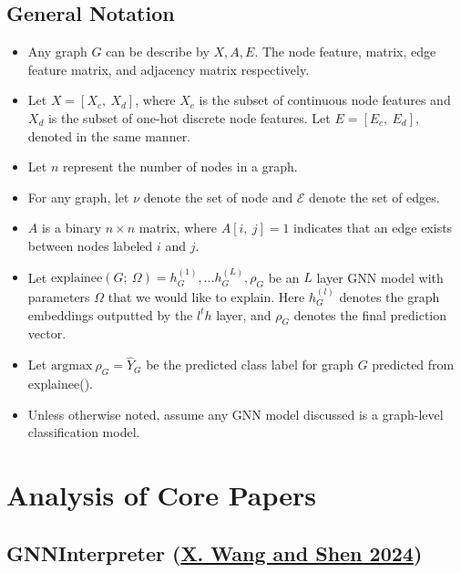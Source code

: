 \documentclass[
  11pt,
  letterpaper,
]{article}
\begin{document}
\hypertarget{general-notation}{%
\subsection{General Notation}\label{general-notation}}

\begin{itemize}
\item
  Any graph \(G\) can be describe by \(X, A, E\). The node feature,
  matrix, edge feature matrix, and adjacency matrix respectively.
\item
  Let \(X = [X_c, \ X_d]\), where \(X_c\) is the subset of continuous
  node features and \(X_d\) is the subset of one-hot discrete node
  features. Let \(E = [E_c, \ E_d]\), denoted in the same manner.
\item
  Let \(n\) represent the number of nodes in a graph.
\item
  For any graph, let \(\nu\) denote the set of node and \(\mathcal{E}\)
  denote the set of edges.
\item
  \(A\) is a binary \(n \times n\) matrix, where \(A[i, \ j] = 1\)
  indicates that an edge exists between nodes labeled \(i\) and \(j\).
\item
  Let
  \(\text{explainee}(G; \ \Omega) = h^{(1)}_G, \dots h^{(L)}_G, \rho_G\)
  be an \(L\) layer GNN model with parameters \(\Omega\) that we would
  like to explain. Here \(h^{(l)}_G\) denotes the graph embeddings
  outputted by the \(l^th\) layer, and \(\rho_G\) denotes the final
  prediction vector.
\item
  Let \(\text{argmax} \ \rho_G = \hat Y_G\) be the predicted class label
  for graph \(G\) predicted from explainee().
\item
  Unless otherwise noted, assume any GNN model discussed is a
  graph-level classification model.
\end{itemize}

\hypertarget{analysis-of-core-papers}{%
\section{Analysis of Core Papers}\label{analysis-of-core-papers}}

\hypertarget{gnninterpreter-wang_shen_2024}{%
\subsection{\texorpdfstring{GNNInterpreter
(\protect\hyperlink{ref-Wang_Shen_2024}{X. Wang and Shen
2024})}{GNNInterpreter (X. Wang and Shen 2024)}}\label{gnninterpreter-wang_shen_2024}}
\end{document}
